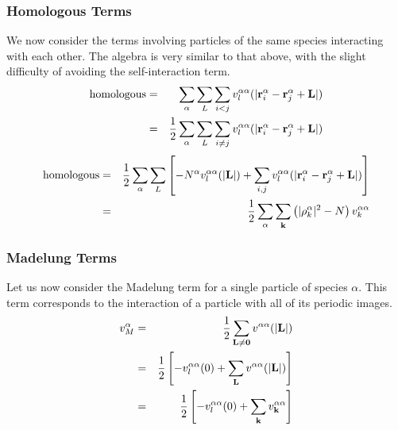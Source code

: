 \subsubsection{Homologous Terms}
We now consider the terms involving particles of the same species
interacting with each other.  The algebra is very similar to that
above, with the slight difficulty of avoiding the self-interaction term.
\begin{eqnarray}
\text{homologous} & = & \sum_\alpha \sum_L \sum_{i<j} v_l^{\alpha
  \alpha}(|\mathbf{r}_i^\alpha - \mathbf{r}_j^\alpha + \mathbf{L}|) \\
 & = & \frac{1}{2} \sum_\alpha \sum_L \sum_{i\neq j} v_l^{\alpha
  \alpha}(|\mathbf{r}_i^\alpha - \mathbf{r}_j^\alpha + \mathbf{L}|) 
\end{eqnarray}
\begin{eqnarray}
\text{homologous} & = & \frac{1}{2} \sum_\alpha \sum_L 
\left[
-N^\alpha v_l^{\alpha \alpha}(|\mathbf{L}|)  + \sum_{i,j} v^{\alpha \alpha}_l(|\mathbf{r}_i^\alpha - \mathbf{r}_j^\alpha + \mathbf{L}|)
  \right] \\
& = & \frac{1}{2} \sum_\alpha \sum_{\mathbf{k}} \left(|\rho_k^\alpha|^2 - N
\right) v_k^{\alpha \alpha}
\end{eqnarray}

\subsubsection{Madelung Terms}
Let us now consider the Madelung term for a single particle of species
$\alpha$.  This term corresponds to the interaction of a particle with
all of its periodic images.  
\begin{eqnarray}
v_M^{\alpha} & = & \frac{1}{2} \sum_{\mathbf{L} \neq \mathbf{0}} v^{\alpha
  \alpha}(|\mathbf{L}|) \\
& = & \frac{1}{2} \left[ -v_l^{\alpha \alpha}(0) + \sum_{\mathbf{L}} v^{\alpha
  \alpha}(|\mathbf{L}|) \right] \\
& = & \frac{1}{2} \left[ -v_l^{\alpha \alpha}(0) + \sum_{\mathbf{k}} v^{\alpha
  \alpha}_{\mathbf{k}} \right]  
\end{eqnarray}

